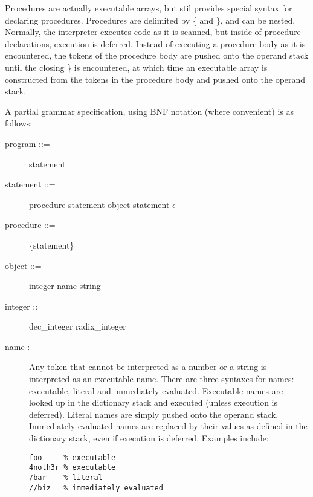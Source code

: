 Procedures are actually executable arrays, but stil provides special syntax for
declaring procedures.  Procedures are delimited by \{ and \}, and can be
nested.  Normally, the interpreter executes code as it is scanned, but inside of
procedure declarations, execution is deferred.  Instead of executing a procedure
body as it is encountered, the tokens of the procedure body are pushed onto the
operand stack until the closing \} is encountered, at which time an executable
array is constructed from the tokens in the procedure body and pushed onto the
operand stack.

A partial grammar specification, using BNF notation (where convenient) is as
follows:

\begin{description}
\item[{\lt}program{\gt} ::= ] {\lt}statement{\gt}

\item[{\lt}statement{\gt} ::= ] {\lt}procedure{\gt} {\lt}statement{\gt} {\pipe}
{\lt}object{\gt} {\lt}statement{\gt} {\pipe} $\epsilon$

\item[{\lt}procedure{\gt} ::= ] \{{\lt}statement{\gt}\}

\item[{\lt}object{\gt} ::= ] {\lt}integer{\gt} {\pipe} {\lt}name{\gt} {\pipe}
{\lt}string{\gt}

\item[{\lt}integer{\gt} ::= ] {\lt}dec\_integer{\gt} {\pipe}
{\lt}radix\_integer{\gt}

\item[{\lt}name{\gt} : ] Any token that cannot be interpreted as a number or a
string is interpreted as an executable name.  There are three syntaxes for
names: executable, literal and immediately evaluated.  Executable names are
looked up in the dictionary stack and executed (unless execution is deferred).
Literal names are simply pushed onto the operand stack.  Immediately evaluated
names are replaced by their values as defined in the dictionary stack, even if
execution is deferred.  Examples include:
\begin{verbatim}
foo     % executable
4noth3r % executable
/bar    % literal
//biz   % immediately evaluated
\end{verbatim}


\end{description}
